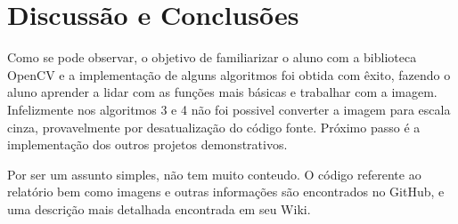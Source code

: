 \section{Discussão e Conclusões}

Como se pode observar, o objetivo de familiarizar o aluno com a biblioteca OpenCV e a implementação de alguns algoritmos foi obtida com êxito, fazendo o aluno aprender a lidar com as funções mais básicas e trabalhar com a imagem. Infelizmente nos algoritmos 3 e 4 não foi possivel converter a imagem para escala cinza, provavelmente por desatualização do código fonte. Próximo passo é a implementação dos outros projetos demonstrativos.

Por ser um assunto simples, não tem muito conteudo. O código referente ao relatório bem como imagens e outras informações são encontrados no GitHub\cite{GitHub}, e uma descrição mais detalhada encontrada em seu Wiki\cite{GitWiki}.


